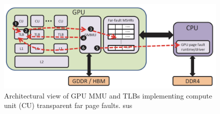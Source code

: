     \begin{figure}[!htb]
      \centering
      \setlength{\abovecaptionskip}{6pt plus 1pt minus 1pt}
      \includegraphics[width=.90\textwidth,keepaspectratio]{figures1/MMU.elf}
      \captionsetup{width=.90\textwidth}
      \caption{Architectural view of GPU MMU and TLBs implementing compute unit (CU) transparent far page faults.
sus}
      \label{fig:mmu}
   \end{figure}
